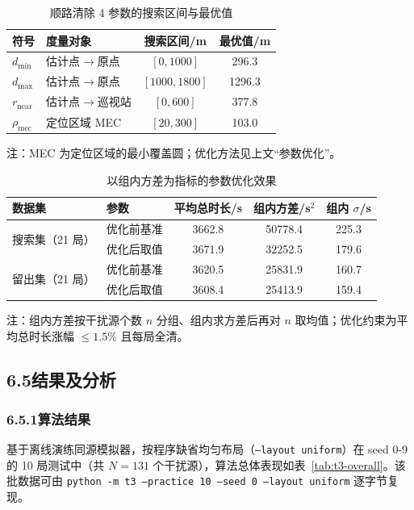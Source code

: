 \documentclass[UTF8, zihao=5,AutoFakeBold=2]{ctexart}
\begin{document}
\begin{table}[H]
    \centering
    \caption{顺路清除 4 参数的搜索区间与最优值}
    \label{tab:t3-inline}
    \begin{tabular}{llcc}
        \toprule
        符号 & 度量对象 & 搜索区间/m & 最优值/m \\
        \midrule
        \(d_{\min}\) & 估计点\(\to\)原点 & \([0,1000]\) & 296.3 \\
        \(d_{\max}\) & 估计点\(\to\)原点 & \([1000,1800]\) & 1296.3 \\
        \(r_{\text{near}}\) & 估计点\(\to\)巡视站 & \([0,600]\) & 377.8 \\
        \(\rho_{\text{mec}}\) & 定位区域 MEC & \([20,300]\) & 103.0 \\
        \bottomrule
    \end{tabular}
    \par\smallskip
    \footnotesize{注：MEC 为定位区域的最小覆盖圆；优化方法见上文“参数优化”。}
\end{table}

\begin{table}[H]
    \centering
    \caption{以组内方差为指标的参数优化效果}
    \label{tab:t3-var}
    \begin{tabular}{llccc}
        \toprule
        数据集 & 参数 & 平均总时长/s & 组内方差/s\(^2\) & 组内 \(\sigma\)/s \\
        \midrule
        \multirow{2}{*}{搜索集（21 局）} & 优化前基准 & 3662.8 & 50778.4 & 225.3 \\
                                        & 优化后取值 & 3671.9 & 32252.5 & 179.6 \\
        \multirow{2}{*}{留出集（21 局）} & 优化前基准 & 3620.5 & 25831.9 & 160.7 \\
                                        & 优化后取值 & 3608.4 & 25413.9 & 159.4 \\
        \bottomrule
    \end{tabular}
    \par\smallskip
    \footnotesize{注：组内方差按干扰源个数 \(n\) 分组、组内求方差后再对 \(n\) 取均值；优化约束为平均总时长涨幅 \(\le 1.5\%\) 且每局全清。}
\end{table}

\subsection*{6.5结果及分析}

\subsubsection*{6.5.1算法结果}
基于离线演练同源模拟器，按程序缺省均匀布局（\texttt{--layout uniform}）在 seed 0-9 的 10 局测试中（共 \(N=131\) 个干扰源），算法总体表现如表~\ref{tab:t3-overall}。该批数据可由 \texttt{python -m t3 --practice 10 --seed 0 --layout uniform} 逐字节复现。
\end{document}

